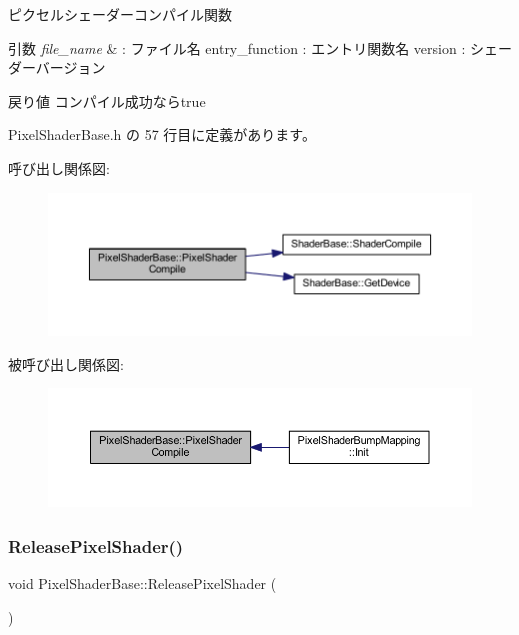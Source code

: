 ピクセルシェーダーコンパイル関数 


\begin{DoxyParams}{引数}
{\em file\+\_\+name} & \+: ファイル名 entry\+\_\+function \+: エントリ関数名 version \+: シェーダーバージョン \\
\hline
\end{DoxyParams}
\begin{DoxyReturn}{戻り値}
コンパイル成功ならtrue 
\end{DoxyReturn}


 Pixel\+Shader\+Base.\+h の 57 行目に定義があります。

呼び出し関係図\+:\nopagebreak
\begin{figure}[H]
\begin{center}
\leavevmode
\includegraphics[width=350pt]{class_pixel_shader_base_ac572f1cb13a4486fc8bc2e60e5a14dc4_cgraph}
\end{center}
\end{figure}
被呼び出し関係図\+:\nopagebreak
\begin{figure}[H]
\begin{center}
\leavevmode
\includegraphics[width=350pt]{class_pixel_shader_base_ac572f1cb13a4486fc8bc2e60e5a14dc4_icgraph}
\end{center}
\end{figure}
\mbox{\label{class_pixel_shader_base_a8e00c19f5ece0a08762442f355195591}} 
\subsubsection{\texorpdfstring{Release\+Pixel\+Shader()}{ReleasePixelShader()}}
{\footnotesize\ttfamily void Pixel\+Shader\+Base\+::\+Release\+Pixel\+Shader (\begin{DoxyParamCaption}{ }\end{DoxyParamCaption})\hspace{0.3cm}{\ttfamily [inline]}}



